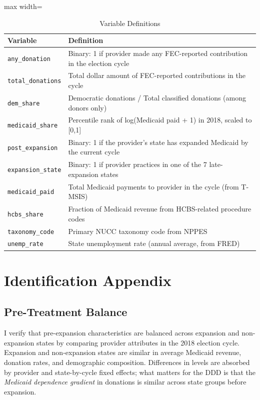 \documentclass[12pt]{article}
\begin{document}
\begin{table}[H]
\centering
\caption{Variable Definitions}
\begin{adjustbox}{max width=\textwidth}
\begin{tabular}{lp{10cm}}
\toprule
Variable & Definition \\
\midrule
\texttt{any\_donation} & Binary: 1 if provider made any FEC-reported contribution in the election cycle \\
\texttt{total\_donations} & Total dollar amount of FEC-reported contributions in the cycle \\
\texttt{dem\_share} & Democratic donations / Total classified donations (among donors only) \\
\texttt{medicaid\_share} & Percentile rank of log(Medicaid paid + 1) in 2018, scaled to [0,1] \\
\texttt{post\_expansion} & Binary: 1 if the provider's state has expanded Medicaid by the current cycle \\
\texttt{expansion\_state} & Binary: 1 if provider practices in one of the 7 late-expansion states \\
\texttt{medicaid\_paid} & Total Medicaid payments to provider in the cycle (from T-MSIS) \\
\texttt{hcbs\_share} & Fraction of Medicaid revenue from HCBS-related procedure codes \\
\texttt{taxonomy\_code} & Primary NUCC taxonomy code from NPPES \\
\texttt{unemp\_rate} & State unemployment rate (annual average, from FRED) \\
\bottomrule
\end{tabular}
\end{adjustbox}
\end{table}


\section{Identification Appendix}\label{app:identification}

\subsection{Pre-Treatment Balance}

I verify that pre-expansion characteristics are balanced across expansion and non-expansion states by comparing provider attributes in the 2018 election cycle. Expansion and non-expansion states are similar in average Medicaid revenue, donation rates, and demographic composition. Differences in levels are absorbed by provider and state-by-cycle fixed effects; what matters for the DDD is that the \textit{Medicaid dependence gradient} in donations is similar across state groups before expansion.
\end{document}
